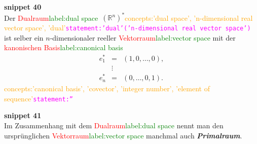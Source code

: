 \documentclass[a4paper,twoside,english,ngerman,deutsch,german,sectrefs,envcountsame,envcountchap]{svmono}
\newcommand{\setref}[2]{\textcolor{red}{#1}\textcolor{green}{#2}}
\newcommand{\snippet}[1]{\textbf{snippet #1}\\}
\newcommand{\eqnote}[2]{\textcolor{orange}{#1}\textcolor{magenta}{\texttt{#2}}}
\begin{document}
\snippet{40}
Der \setref{Dualraum}{label:dual space}~$({\mathbb{R}}^{n})^{*}$\eqnote{concepts:'dual space', 'n-dimensional real vector space', 'dual'}{statement:'dual'('n-dimensional real vector space')} ist selber ein $n$-dimensionaler reeller \setref{Vektorraum}{label:vector space} mit der \setref{kanonischen Basis}{label:canonical basis}
\[
\begin{array}{lcl}
e_{1}^{*} & = & \left(1,0,\ldots,0\right),\\
 & \vdots\\
e_{n}^{*} & = & (0,\ldots,0,1).
\end{array}
\]\eqnote{concepts:'canonical basis', 'covector', 'integer number', 'element of sequence'}{statement:''}

\snippet{41}
Im Zusammenhang mit dem \setref{Dualraum}{label:dual space} nennt man den ursprünglichen \setref{Vektorraum}{label:vector space} manchmal auch \textbf{\em Primalraum}.
\end{document}
